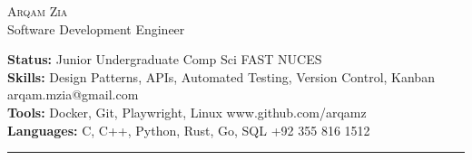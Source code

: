 \documentclass[10pt,A4]{article}
\newcommand{\cvsection}[1]
{
	\begin{center}
		\large\textcolor{sectcol}{\textbf{#1}}
	\end{center}
}
\newcommand{\metasection}[2]
{
\footnotesize{#2} \hspace*{\fill} \footnotesize{#1}\\[1pt]
}
\begin{document}
\pagestyle{fancy}	








\vspace{-8pt}
\begin{center}
	\HUGE \textsc{Arqam Zia} %
        \\[2pt]
	\small Software Development Engineer
\end{center}



\vspace{6pt}


\metasection{FAST NUCES}{\textbf{Status:} Junior Undergraduate Comp Sci}
\metasection{arqam.mzia@gmail.com}{\textbf{Skills:} Design Patterns, APIs, Automated Testing, Version Control, Kanban} 
\metasection{www.github.com/arqamz}{\textbf{Tools:} Docker, Git, Playwright, Linux}
\metasection{+92 355 816 1512}{\textbf{Languages:} C, C++, Python, Rust, Go, SQL}
\vspace{-2pt}
\textcolor{softcol}{\hrule}
\vspace{6pt}

\normalsize

\end{document}
